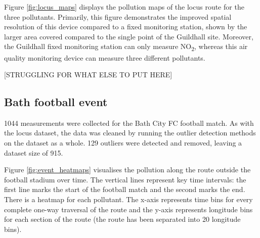 \documentclass[11pt,twosided,a4paper]{report}
\begin{document}
Figure \ref{fig:locus_maps} displays the pollution maps of the locus route for the three pollutants. Primarily, this figure demonstrates the improved spatial resolution of this device compared to a fixed monitoring station, shown by the larger area covered compared to the single point of the Guildhall site. Moreover, the Guildhall fixed monitoring station can only measure NO\textsubscript{2}, whereas this air quality monitoring device can measure three different pollutants.

[STRUGGLING FOR WHAT ELSE TO PUT HERE]


%
%

\newpage

\subsection{Bath football event}  \label{event_results}

\num{1044} measurements were collected for the Bath City FC football match. As with the locus dataset, the data was cleaned by running the outlier detection methods on the dataset as a whole. 129 outliers were detected and removed, leaving a dataset size of 915.

Figure \ref{fig:event_heatmaps} visualises the pollution along the route outside the football stadium over time. The vertical lines represent key time intervals: the first line marks the start of the football match and the second marks the end. There is a heatmap for each pollutant. The x-axis represents time bins for every complete one-way traversal of the route and the y-axis represents longitude bins for each section of the route (the route has been separated into 20 longitude bins).
\end{document}
